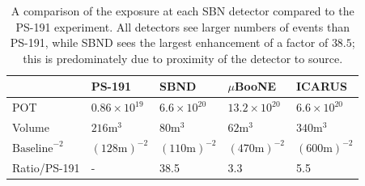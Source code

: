 \documentclass[11pt, a4paper]{article}
\begin{document}
\begin{table}[t!]
\centering
\begin{tabular}{| l || l | l | l | l |}
	\hline
	& PS-191 & SBND & $\mu$BooNE & ICARUS \\ \hline \hline
	POT	& $0.86 \times 10^{19}$	& $6.6 \times 10^{20}$	&	$13.2 \times 10^{20}$     &  $6.6 \times 10^{20}$ \\ \hline
	Volume	& $216\text{m}^3$	&	$80\text{m}^3$	&	$62\text{m}^3$	     &   $340\text{m}^3$	\\ \hline
	$\text{Baseline}^{-2}$	& $(128 	\text{m} )^{-2}$	&$(110 \text{m} )^{-2}$	&	$(470 \text{m} )^{-2}$			     & $(600 \text{m} )^{-2}$	  \\ \hline
Ratio/PS-191 & - 	& 38.5 	& 3.3	& 5.5\\ \hline
\end{tabular}

\caption{\label{tab:exposure} A comparison of the exposure at each SBN detector compared to 
the PS-191 experiment. All detectors see larger numbers of events than PS-191, while SBND 
sees the largest enhancement of a factor of $38.5$; this is predominately due to proximity of the detector to source.}

\end{table}
\end{document}
